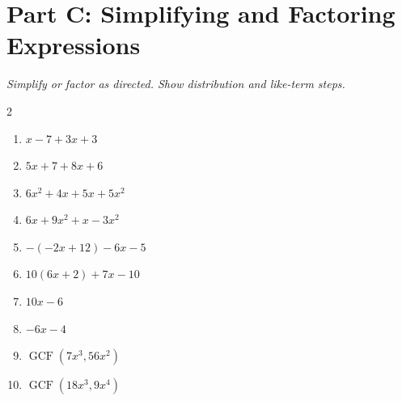 \documentclass[11pt]{article}
\begin{document}
\section*{Part C: Simplifying and Factoring Expressions}
\noindent\textit{Simplify or factor as directed. Show distribution and like-term steps.}
\begin{multicols}{2}
\begin{enumerate}
  \item $x - 7 + 3x + 3$
  \vspace{1.3cm}
  \item $5x + 7 + 8x + 6$
  \vspace{1.3cm}
  \item $6x^{2} + 4x + 5x + 5x^{2}$
  \vspace{1.3cm}
  \item $6x + 9x^{2} + x - 3x^{2}$
  \vspace{1.3cm}
  \item $-(-2x + 12) - 6x - 5$
  \vspace{1.3cm}
  \item $10(6x + 2) + 7x - 10$
  \vspace{1.3cm}
  \item $10x - 6$
  \vspace{1.3cm}
  \item $-6x - 4$
  \vspace{1.3cm}
  \item $\operatorname{GCF}\left(7x^{3}, 56x^{2}\right)$
  \vspace{1.3cm}
  \item $\operatorname{GCF}\left(18x^{3}, 9x^{4}\right)$
  \vspace{1.3cm}
\end{enumerate}
\end{multicols}
\end{document}
